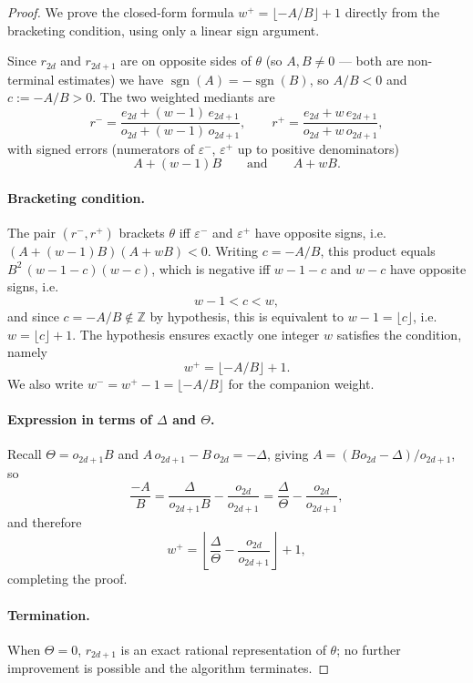 \documentclass[12pt]{article}
\theoremstyle{definition}
\theoremstyle{remark}
\theoremstyle{plain}
\newcommand{\eps}{\varepsilon}
\newcommand{\Kval}{\Theta}
\newcommand{\Dval}{\Delta}
\newcommand{\wplus}{w^{+}}
\newcommand{\wminus}{w^{-}}
\newcommand{\rplus}{r^{+}}
\newcommand{\rminus}{r^{-}}
\newcommand{\epsplus}{\eps^{+}}
\newcommand{\epsminus}{\eps^{-}}
\begin{document}
\begin{proof}
We prove the closed-form formula $\wplus = \lfloor -A/B \rfloor + 1$ directly from
the bracketing condition, using only a linear sign argument.

Since $r_{2d}$ and $r_{2d+1}$ are on opposite sides of $\theta$ (so $A, B \neq 0$
--- both are non-terminal estimates) we have $\operatorname{sgn}(A) = -\operatorname{sgn}(B)$,
so $A/B < 0$ and $c := -A/B > 0$.
The two weighted mediants are
\[
  \rminus = \frac{e_{2d} + (w-1)\,e_{2d+1}}{o_{2d} + (w-1)\,o_{2d+1}}, \qquad
  \rplus = \frac{e_{2d} + w\,e_{2d+1}}{o_{2d} + w\,o_{2d+1}},
\]
with signed errors (numerators of $\epsminus$, $\epsplus$ up to positive denominators)
\[
  A + (w-1)B \qquad \text{and} \qquad A + wB.
\]

\paragraph{Bracketing condition.}

The pair $(\rminus, \rplus)$ brackets $\theta$ iff $\epsminus$ and $\epsplus$ have opposite signs,
i.e.\ $(A + (w-1)B)(A + wB) < 0$.
Writing $c = -A/B$, this product equals $B^2\,(w - 1 - c)(w - c)$, which is negative
iff $w - 1 - c$ and $w - c$ have opposite signs, i.e.\
\[
  w - 1 < c < w,
\]
and since $c = -A/B \notin \mathbb{Z}$ by hypothesis,
this is equivalent to $w - 1 = \lfloor c \rfloor$, i.e.\ $w = \lfloor c \rfloor + 1$.
The hypothesis ensures exactly one integer $w$ satisfies the condition, namely
\[
  \wplus = \lfloor -A/B \rfloor + 1.
\]
We also write $\wminus = \wplus - 1 = \lfloor -A/B \rfloor$ for the companion weight.

\paragraph{Expression in terms of $\Dval$ and $\Kval$.}

Recall $\Kval = o_{2d+1}B$ and $A\,o_{2d+1} - B\,o_{2d} = -\Dval$, giving
$A = (Bo_{2d} - \Dval)/o_{2d+1}$, so
\[
  \frac{-A}{B} = \frac{\Dval}{o_{2d+1}B} - \frac{o_{2d}}{o_{2d+1}}
               = \frac{\Dval}{\Kval} - \frac{o_{2d}}{o_{2d+1}},
\]
and therefore
\[
  \wplus = \left\lfloor \frac{\Dval}{\Kval} - \frac{o_{2d}}{o_{2d+1}} \right\rfloor + 1,
\]
completing the proof.

\paragraph{Termination.}
When $\Kval = 0$, $r_{2d+1}$ is an exact rational representation of $\theta$;
no further improvement is possible and the algorithm terminates.
\end{proof}
\end{document}
